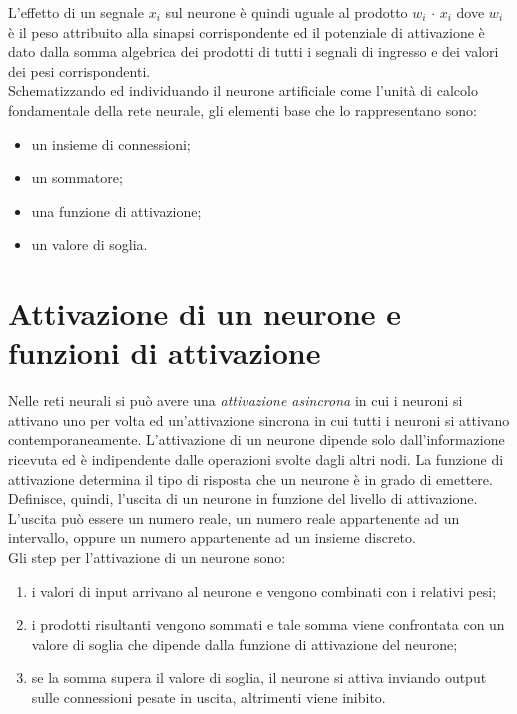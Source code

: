 \documentclass[12pt,a4paper,oneside]{book}
\begin{document}
		L'effetto di un segnale $ x_{i} $ sul neurone è quindi uguale al prodotto 
		$w_{i}$ $\cdot$ $x_{i}$ dove $w_{i}$ è il peso attribuito alla sinapsi corrispondente ed il potenziale di attivazione è dato dalla somma algebrica dei prodotti di tutti i segnali di ingresso e dei valori dei pesi corrispondenti.\\
	 	Schematizzando ed individuando il neurone artificiale come l'unità di calcolo fondamentale della rete neurale, gli elementi base che lo rappresentano sono:
		
		\begin{itemize}
			\item un insieme di connessioni;
			\item un sommatore;
			\item una funzione di attivazione;
			\item un valore di soglia.
		\end{itemize}
		
		
	
	\section{Attivazione di un neurone e funzioni di attivazione}
		
		Nelle reti neurali si può avere una \emph{attivazione asincrona} in cui i neuroni si attivano uno per volta ed un'{attivazione sincrona} in cui tutti i neuroni si attivano contemporaneamente. L'attivazione di un neurone dipende solo dall'informazione ricevuta ed è indipendente dalle operazioni svolte dagli altri nodi. La funzione di attivazione determina il tipo di risposta che un neurone è in grado di emettere. Definisce, quindi, l’uscita di un neurone in funzione del livello di attivazione. L'uscita può essere un numero reale, un numero reale appartenente ad un intervallo, oppure un numero appartenente ad un insieme discreto.\\
		Gli step per l'attivazione di un neurone sono:
		
		\begin{enumerate}
		\item i valori di input arrivano al neurone e vengono combinati con i relativi pesi; 
		\item i prodotti risultanti vengono sommati e tale somma viene confrontata con un valore di soglia che dipende dalla funzione di attivazione del neurone;
		\item se la somma supera il valore di soglia, il neurone si attiva inviando output sulle connessioni pesate in uscita, altrimenti viene inibito.
		\end{enumerate}
	
\end{document}
